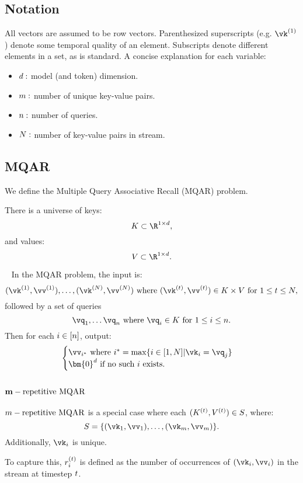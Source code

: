 \subsection{Notation}
All vectors are assumed to be row vectors.
Parenthesized superscripts (e.g. $\vk^{(1)}$) denote some temporal quality of an element.  Subscripts denote different elements in a set, as is standard.
A concise explanation for each variable:
\begin{itemize}[leftmargin=*]
    \item $d:$ model (and token) dimension.
    \item $m:$ number of unique key-value pairs.
    \item $n:$ number of queries.
    \item $N:$ number of key-value pairs in stream.
\end{itemize}
\subsection{MQAR}
We define the Multiple Query Associative Recall (MQAR) problem.
\begin{definition}
    There is a universe of keys:
\[ K \subset \R^{1\times\modelDim},\]
and values:
\[ V \subset \R^{1\times\modelDim}.\]
\end{definition}
\begin{definition}
~\cite{arora2023zoologymeasuringimprovingrecall} In the MQAR problem, the input is:
\[\kvpair{1}, \hdots, \kvpair{\contextSize} \text{ where } \kvpair{\timestep} \in K\times V \text{ for } 1\le \timestep \le \contextSize,\]
followed by a set of queries \[\vq_{1}, \hdots \vq_{\numQueries} \text{ where } \vq_i \in K \text{ for } 1\le i \le \numQueries.\]
Then for each $i\in[n]$, output:
\[
\begin{cases}
    \vv_{i^{*}} \text{ where } i^{*} = \max\{i\in[1,\contextSize] | \vk_{i}=\vq_{j}\} \\
    \bm{0}^{\modelDim} \text{ if no such } i \text{ exists.}
\end{cases}
\]
\end{definition}
\subsection{$\mathbf{m}-\text{repetitive MQAR}$}
\begin{definition}
$m-\text{repetitive MQAR}$ is a special case where each $(K^{(t)}, V^{(t)})\in S$, where:
\[S = \{(\vk_1, \vv_1), \hdots, (\vk_{\numPairs}, \vv_{\numPairs})\}.\]
Additionally, $\vk_{i}$ is unique.
\end{definition}
\begin{definition}
To capture this, $r_{i}^{(t)}$ is defined as the number of occurrences of $(\vk_{i}, \vv_{i})$ in the stream at timestep $t$.
\end{definition}
